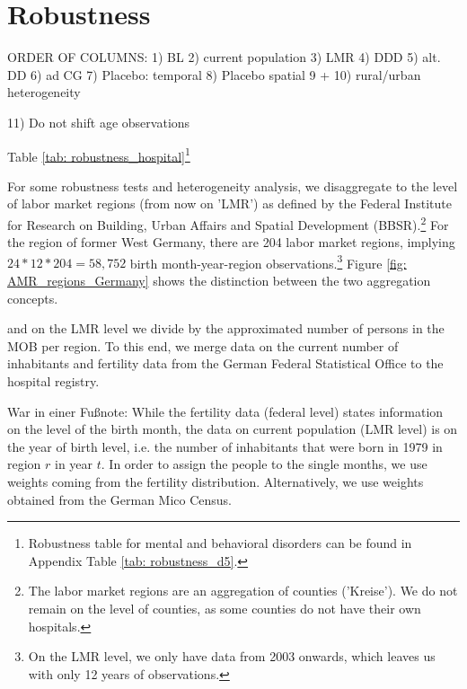 \documentclass[11pt, a4paper]{article} %
\begin{document}
\newpage
\section{Robustness}\label{sec: robustness}


ORDER OF COLUMNS:
1) BL 
2) current population 
3) LMR 
4) DDD
5) alt. DD 
6) ad CG 
7) Placebo: temporal 
8) Placebo spatial  
9 + 10) rural/urban heterogeneity 

11) Do not shift age observations


Table \ref{tab: robustness_hospital}\footnote{Robustness table for mental and behavioral disorders can be found in Appendix Table \ref{tab: robustness_d5}.}


For some robustness tests and heterogeneity analysis, we disaggregate to the level of labor market regions (from now on 'LMR') as defined by the Federal Institute  for Research on Building, Urban Affairs and Spatial Development (BBSR).\footnote{The labor market regions are an aggregation of counties ('Kreise'). We do not remain on the level of counties, as some counties do not have their own hospitals.} For the region of former West Germany, there are 204 labor market regions, implying $24*12*204= 58,752$ birth month-year-region observations.\footnote{On the LMR level, we only have data from 2003 onwards, which leaves us with only 12 years of observations.} Figure \ref{fig: AMR_regions_Germany} shows the distinction between the two aggregation concepts.



and on the LMR level we divide by the approximated number of persons in the MOB per region. To this end, we merge data on the current number of inhabitants and fertility data from the German Federal Statistical Office to the hospital registry.

War in einer Fußnote:
While the fertility data (federal level) states information on the level of the birth month, the data on current population (LMR level) is on the year of birth level, i.e. the number of inhabitants that were born in 1979 in region $r$ in year $t$. In order to assign the people to the single months, we use weights coming from the fertility distribution. Alternatively, we use weights obtained from the German Mico Census.
\end{document}
